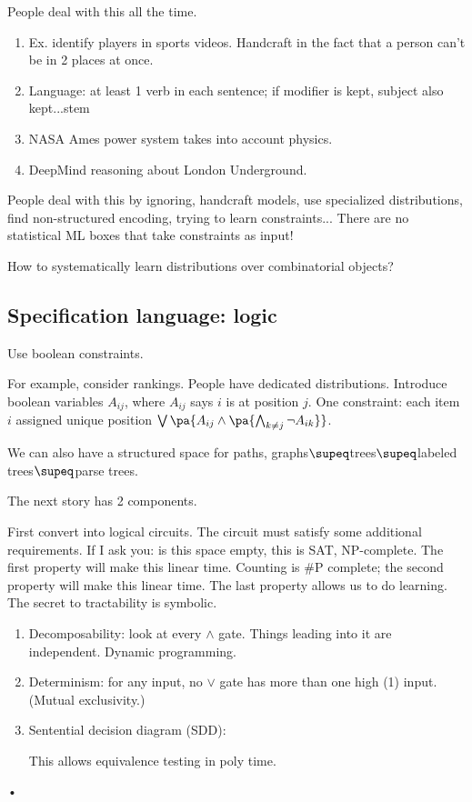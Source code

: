 People deal with this all the time. 
\begin{enumerate}
\item
Ex. identify players in sports videos. Handcraft in the fact that a person can't be in 2 places at once. 
\item
Language: at least 1 verb in each sentence; if modifier is kept, subject also kept...stem
\item
NASA Ames power system takes into account physics.\item
DeepMind reasoning about London Underground.
\end{enumerate}

People deal with this by ignoring, handcraft models, use specialized distributions, find non-structured encoding, trying to learn constraints... There are no statistical ML boxes that take constraints as input!

How to systematically learn distributions over combinatorial objects? 

\subsection{Specification language: logic}

Use boolean constraints. 

For example, consider rankings. People have dedicated distributions. Introduce boolean variables $A_{ij}$, where $A_{ij}$ says $i$ is at position $j$. One constraint: each item $i$ assigned unique position $\bigvee \pa{A_{ij} \wedge \pa{\bigwedge_{k\ne j}\neg A_{ik}}}$.

We can also have a structured space for paths, graphs$\supeq$trees$\supeq$labeled trees$\supeq$parse trees.

The next story has 2 components. %

First convert into logical circuits. The circuit must satisfy some additional requirements. 
If I ask you: is this space empty, this is SAT, NP-complete.
The first property will make this linear time.
Counting is $\#$P complete; the second property will make this linear time.
The last property allows us to do learning.
The secret to tractability is symbolic.
\begin{enumerate}
\item
Decomposability: look at every $\wedge$ gate. Things leading into it are independent. Dynamic programming.
\item
Determinism: for any input, no $\vee$ gate has more than one high (1) input. (Mutual exclusivity.)
\item
Sentential decision diagram (SDD): %

This allows equivalence testing in poly time.
\end{enumerate}•

